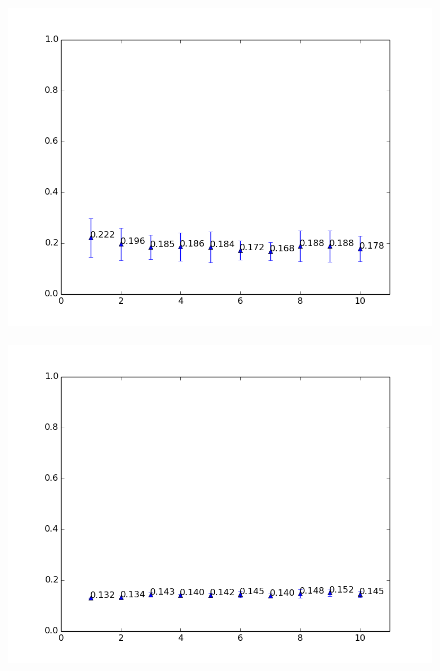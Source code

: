 \begin{figure}[h!]
	\centering
	\begin{minipage}{.49\linewidth}
		\includegraphics[width=\linewidth]{fig/PartyAllComparisonSpam-eps1.0,budg=eps,peers30,groups1-10,reg2e-2-pubParty-newAggregationStyleTEST.png}
		\label{fig:RegRangeTestPubParty}
	\end{minipage}
	\hspace{.001\linewidth}
	\begin{minipage}{.49\linewidth}
		\includegraphics[width=\linewidth]{fig/PartyAllComparisonSpam-eps1.0,budg=eps,peers30,groups1-10,reg2e-2-pubAll-newAggregationStyleTEST.png}
		\label{fig:RegRangeTestPubAll}
	\end{minipage}
\end{figure}

